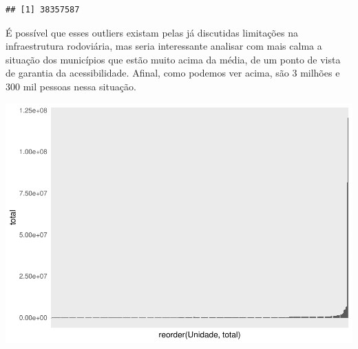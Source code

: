 \documentclass[]{article}
\newenvironment{Shaded}{\begin{snugshade}}{\end{snugshade}}
\newcommand{\DataTypeTok}[1]{\textcolor[rgb]{0.13,0.29,0.53}{#1}}
\newcommand{\DecValTok}[1]{\textcolor[rgb]{0.00,0.00,0.81}{#1}}
\newcommand{\KeywordTok}[1]{\textcolor[rgb]{0.13,0.29,0.53}{\textbf{#1}}}
\newcommand{\NormalTok}[1]{#1}
\newcommand{\OperatorTok}[1]{\textcolor[rgb]{0.81,0.36,0.00}{\textbf{#1}}}
\newcommand{\StringTok}[1]{\textcolor[rgb]{0.31,0.60,0.02}{#1}}
\begin{document}
\begin{verbatim}
## [1] 38357587
\end{verbatim}

É possível que esses outliers existam pelas já discutidas limitações na
infraestrutura rodoviária, mas seria interessante analisar com mais
calma a situação dos municípios que estão muito acima da média, de um
ponto de vista de garantia da acessibilidade. Afinal, como podemos ver
acima, são 3 milhões e 300 mil pessoas nessa situação.

\begin{Shaded}
\end{Shaded}

\includegraphics{trabalho_de_conclusao_final_files/figure-latex/unnamed-chunk-10-1.pdf}
\end{document}
